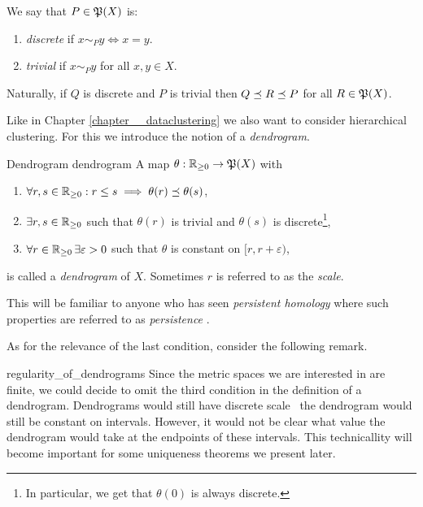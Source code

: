 \begin{definition}{}{}
We say that $P \in \P(X)$ is:
\begin{enumerate}
    \item \emph{discrete} if $x \sim_P y \iff x = y$.
    \item \emph{trivial} if $x \sim_P y$ for all $x,y \in X$.
\end{enumerate}
\end{definition}

Naturally, if $Q$ is discrete and $P$ is trivial then $Q \refines R \refines P$ for all $R \in \P(X)$.

Like in Chapter \ref{chapter__dataclustering} we also want to consider hierarchical clustering.
For this we introduce the notion of a \emph{dendrogram}.

\begin{definition}{Dendrogram \cite[Def.~2.2]{Carlsson2010}}{dendrogram}
A map $\theta: \R_{\geq0} \to \mathfrak{P}(X)$ with
\begin{enumerate}
    \item $\forall r,s \in \R_{\geq0}: r \leq s \implies  \theta(r) \refines \theta(s)$,
    \item $\exists r,s \in \R_{\geq0}$ such that $\theta(r)$ is trivial and $\theta(s)$ is discrete\footnote{In particular, we get that $\theta(0)$ is always discrete.},
    \item $\forall r \in \R_{\geq0} \,\exists \varepsilon > 0$ such that $\theta$ is constant on $[r, r + \varepsilon)$,
\end{enumerate}
is called a \emph{dendrogram} of $X$. Sometimes $r$ is referred to as the \emph{scale}.
\end{definition}

This will be familiar to anyone who has seen \emph{persistent homology} where such properties are referred to as \emph{persistence} \cite[Chap.~3]{Carlsson2014}.

As for the relevance of the last condition, consider the following remark.

\begin{myremark}{}{regularity_of_dendrograms}
Since the metric spaces we are interested in are finite, we could decide to omit the third condition in the definition of a dendrogram.
Dendrograms would still have discrete scale \ie\ the dendrogram would still be constant on intervals.
However, it would not be clear what value the dendrogram would take at the endpoints of these intervals.
This technicallity will become important for some uniqueness theorems we present later.
\end{myremark}

